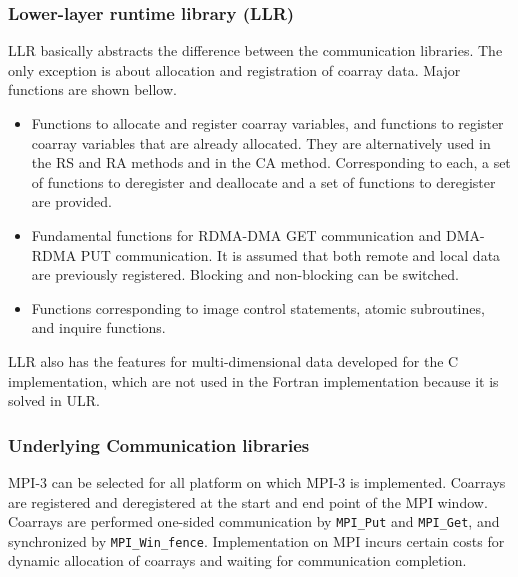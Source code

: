 \subsubsection{Lower-layer runtime library (LLR)}

LLR basically abstracts the difference between the communication libraries.
The only exception is about allocation and registration of coarray data.
Major functions are shown bellow.

\begin{itemize}
\item
Functions to allocate and register coarray variables,
and functions to register coarray variables that are already allocated.
They are alternatively used in the RS and RA methods and in the CA method.
Corresponding to each, a set of functions to deregister and deallocate and
a set of functions to deregister are provided.

\item
Fundamental functions for RDMA-DMA GET communication and DMA-RDMA PUT communication.
It is assumed that both remote and local data are previously registered.
Blocking and non-blocking can be switched.

\item
Functions corresponding to image control statements, atomic subroutines,
and inquire functions.

\end{itemize}

LLR also has the features for multi-dimensional data developed for the C 
implementation, which are not used in the Fortran implementation because
it is solved in ULR.


\subsubsection{Underlying Communication libraries}

MPI-3 can be selected for all platform on which MPI-3 is implemented. Coarrays are 
registered and deregistered at the start and end point of the MPI window. 
Coarrays are performed one-sided communication by {\tt MPI\_Put} and {\tt MPI\_Get},
and synchronized by {\tt MPI\_Win\_fence}. 
Implementation on MPI incurs certain costs for dynamic allocation of coarrays and 
waiting for communication completion.

